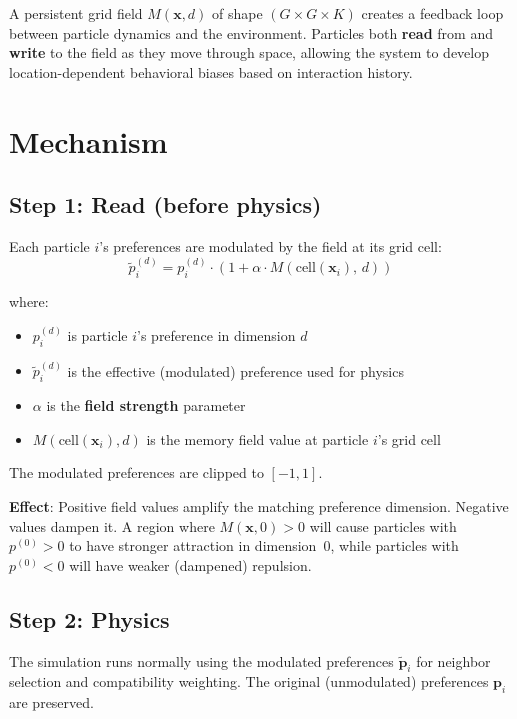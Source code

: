 \documentclass[11pt,a4paper]{article}
\begin{document}
A persistent grid field $M(\mathbf{x}, d)$ of shape $(G \times G \times K)$ creates a feedback loop between particle dynamics and the environment. Particles both \textbf{read} from and \textbf{write} to the field as they move through space, allowing the system to develop location-dependent behavioral biases based on interaction history.

\section{Mechanism}

\subsection{Step 1: Read (before physics)}

Each particle $i$'s preferences are modulated by the field at its grid cell:
\begin{equation}
\tilde{p}_i^{(d)} = p_i^{(d)} \cdot \left(1 + \alpha \cdot M\!\left(\mathrm{cell}(\mathbf{x}_i),\, d\right)\right)
\end{equation}

where:
\begin{itemize}[nosep]
\item $p_i^{(d)}$ is particle $i$'s preference in dimension $d$
\item $\tilde{p}_i^{(d)}$ is the effective (modulated) preference used for physics
\item $\alpha$ is the \textbf{field strength} parameter
\item $M\!\left(\mathrm{cell}(\mathbf{x}_i), d\right)$ is the memory field value at particle $i$'s grid cell
\end{itemize}

The modulated preferences are clipped to $[-1, 1]$.

\textbf{Effect}: Positive field values amplify the matching preference dimension. Negative values dampen it. A region where $M(\mathbf{x}, 0) > 0$ will cause particles with $p^{(0)} > 0$ to have stronger attraction in dimension~0, while particles with $p^{(0)} < 0$ will have weaker (dampened) repulsion.

\subsection{Step 2: Physics}

The simulation runs normally using the modulated preferences $\tilde{\mathbf{p}}_i$ for neighbor selection and compatibility weighting. The original (unmodulated) preferences $\mathbf{p}_i$ are preserved.
\end{document}
